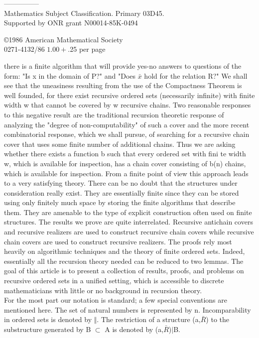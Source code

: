 \documentclass[twoside]{article}
\begin{document}
---------------\\
 Mathematics Subject Classification. Primary 03D45.\\
\indent Supported by ONR grant N00014-85K-0494
\newline
\begin{flushright}
\copyright 1986 American Mathematical Society\\ 0271-4132/86 $1.00 + $.25 per page
\end{flushright}
\onehalfspacing
\newpage
\addtolength{\voffset}{1.5cm}
there is a finite algorithm that will provide yes-no answers to questions of the form:  "Is    x    in the domain of    P?" and "Does $\bar{x}$    hold for the relation R?"  We shall see that the uneasiness resulting from the use of the Compactness Theorem is well founded,  for there exist recursive ordered sets (necessarily infinite) with finite width   w   that   cannot be covered by w recursive chains.    
Two reasonable responses to this negative result are the traditional recursion theoretic response of analyzing the "degree of non-computability" of such a cover and the more recent combinatorial response, which we shall pursue, of searching for a recursive chain cover that uses some finite number of additional chains. 
Thus we are asking whether there exists a function b such that every ordered set with fini te width w, which is available for inspection, has a chain cover consisting of b(n) chains, which is available for inspection. 
From a finite point of view this approach leads to a very satisfying theory. 
There can be no doubt that the structures under consideration really exist. 
They are essentially finite since they can be stored using only finitely much space by storing the finite algorithms that describe them.    
They are amenable to the type of explicit construction often used on finite structures.    
The results we prove are quite interrelated. Recursive antichain covers and recursive realizers are used to construct recursive chain covers while recursive chain covers are used to construct recursive realizers.
The proofs rely most heavily on algorithmic techniques and the theory of finite ordered sets.    
Indeed, essentially all the recursion theory needed can be reduced to two lemmas. 
The goal of this article is to present a collection of results, proofs, and problems on recursive ordered sets in a unified setting, which is accessible to discrete mathematicians with little or no background in recursion theory.\\
\newline
For the most part our notation is standard; a few special conventions are mentioned here. The set of natural numbers is represented by n. 
Incomparability in ordered sets is denoted by $\Vert$. The restriction of a structure (a,$\bar{R}$) to the substructure generated by B $\subset$ A is denoted by (a,$\bar{R}$)$\vert$B.\\
\end{document}
